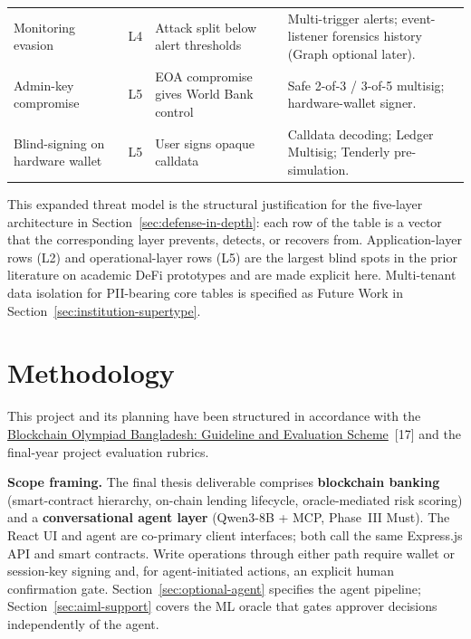 \documentclass[12pt,a4paper]{report}
\begin{document}
\begin{table}[H]
\begin{tabular}{@{}p{2.3cm}p{1.1cm}p{3.6cm}p{5.8cm}@{}}
\rowcolor{RowShade}
Monitoring evasion & L4 & Attack split below alert thresholds & Multi-trigger alerts; event-listener forensics history (Graph optional later). \\
Admin-key compromise & L5 & EOA compromise gives World Bank control & Safe 2-of-3 / 3-of-5 multisig; hardware-wallet signer. \\
\rowcolor{RowShade}
Blind-signing on hardware wallet & L5 & User signs opaque calldata & Calldata decoding; Ledger Multisig; Tenderly pre-simulation. \\
\bottomrule
\end{tabular}
\end{table}

This expanded threat model is the structural justification for the five-layer architecture in Section~\ref{sec:defense-in-depth}: each row of the table is a vector that the corresponding layer prevents, detects, or recovers from. Application-layer rows (L2) and operational-layer rows (L5) are the largest blind spots in the prior literature on academic DeFi prototypes and are made explicit here. Multi-tenant data isolation for PII-bearing core tables is specified as Future Work in Section~\ref{sec:institution-supertype}.

\chapter{Methodology}

This project and its planning have been structured in accordance with the \href{https://bcolbd.org/uploads/guideline/BLOCKCHAIN\%20OLYMPIAD\%20BANGLADESH\%20Blockchain\%20Guideline.pdf}{Blockchain Olympiad Bangladesh: Guideline and Evaluation Scheme}~[17] and the final-year project evaluation rubrics.

\noindent\textbf{Scope framing.} The final thesis deliverable comprises \textbf{blockchain banking} (smart-contract hierarchy, on-chain lending lifecycle, oracle-mediated risk scoring) and a \textbf{conversational agent layer} (Qwen3-8B + MCP, Phase~III Must). The React UI and agent are co-primary client interfaces; both call the same Express.js API and smart contracts. Write operations through either path require wallet or session-key signing and, for agent-initiated actions, an explicit human confirmation gate. Section~\ref{sec:optional-agent} specifies the agent pipeline; Section~\ref{sec:aiml-support} covers the ML oracle that gates approver decisions independently of the agent.
\end{document}
